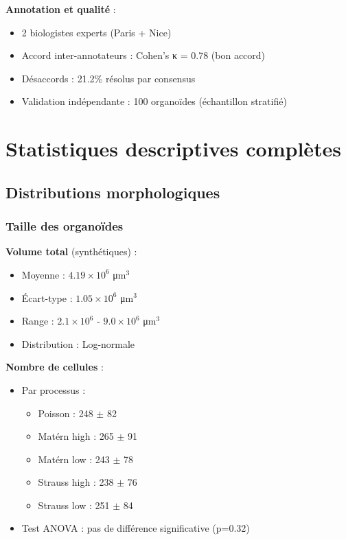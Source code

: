 \textbf{Annotation et qualité} :
\begin{itemize}
    \item 2 biologistes experts (Paris + Nice)
    \item Accord inter-annotateurs : Cohen's κ = 0.78 (bon accord)
    \item Désaccords : 21.2\% résolus par consensus
    \item Validation indépendante : 100 organoïdes (échantillon stratifié)
\end{itemize}

\section{Statistiques descriptives complètes}

\subsection{Distributions morphologiques}

\subsubsection{Taille des organoïdes}

\textbf{Volume total} (synthétiques) :
\begin{itemize}
    \item Moyenne : $4.19 \times 10^6$ μm$^3$
    \item Écart-type : $1.05 \times 10^6$ μm$^3$
    \item Range : $2.1 \times 10^6$ - $9.0 \times 10^6$ μm$^3$
    \item Distribution : Log-normale
\end{itemize}

\textbf{Nombre de cellules} :
\begin{itemize}
    \item Par processus :
        \begin{itemize}
            \item Poisson : 248 $\pm$ 82
            \item Matérn high : 265 $\pm$ 91
            \item Matérn low : 243 $\pm$ 78
            \item Strauss high : 238 $\pm$ 76
            \item Strauss low : 251 $\pm$ 84
        \end{itemize}
    \item Test ANOVA : pas de différence significative (p=0.32)
\end{itemize}

